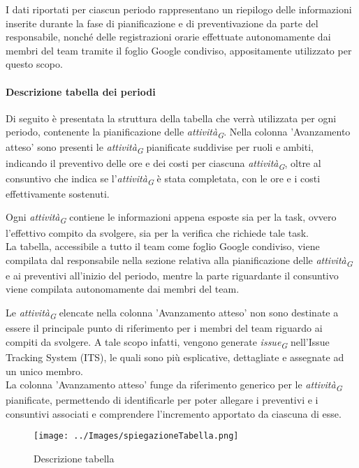 \vspace{0.2cm}

I dati riportati per ciascun periodo rappresentano un riepilogo delle informazioni inserite durante la fase di pianificazione e di preventivazione da parte del responsabile, nonché delle registrazioni orarie effettuate autonomamente dai membri del team tramite il foglio Google condiviso, appositamente utilizzato per questo scopo.

\paragraph{Descrizione tabella dei periodi}\label{sec:DescrTabella}

Di seguito è presentata la struttura della tabella che verrà utilizzata per ogni periodo, contenente la pianificazione delle \textit{attività}\textsubscript{\textit{G}}. Nella colonna 'Avanzamento atteso' sono presenti le \textit{attività}\textsubscript{\textit{G}} pianificate suddivise per ruoli e ambiti, indicando il preventivo delle ore e dei costi per ciascuna \textit{attività}\textsubscript{\textit{G}}, oltre al consuntivo che indica se l'\textit{attività}\textsubscript{\textit{G}} è stata completata, con le ore e i costi effettivamente sostenuti.

\vspace{0.2cm}

Ogni \textit{attività}\textsubscript{\textit{G}} contiene le informazioni appena esposte sia per la task, ovvero l'effettivo compito da svolgere,  sia per la verifica che richiede tale task. \\
La tabella, accessibile a tutto il team come foglio Google condiviso, viene compilata dal responsabile nella sezione relativa alla pianificazione delle \textit{attività}\textsubscript{\textit{G}} e ai preventivi all'inizio del periodo, mentre la parte riguardante il consuntivo viene compilata autonomamente dai membri del team.

\vspace{0.2cm}

Le \textit{attività}\textsubscript{\textit{G}} elencate nella colonna 'Avanzamento atteso' non sono destinate a essere il principale punto di riferimento per i membri del team riguardo ai compiti da svolgere. A tale scopo infatti, vengono generate \textit{issue}\textsubscript{\textit{G}} nell'Issue Tracking System (ITS), le quali sono più esplicative, dettagliate e assegnate ad un unico membro. \\
La colonna 'Avanzamento atteso' funge da riferimento generico per le \textit{attività}\textsubscript{\textit{G}} pianificate, permettendo di identificarle per poter allegare i preventivi e i consuntivi associati e comprendere l'incremento apportato da ciascuna di esse.

\vspace{0.5cm}

\begin{figure}[H]
    \centering
    \texttt{[image: ../Images/spiegazioneTabella.png]}
    \caption{Descrizione tabella} 
    \label{fig:spiegazioneTabella} 
\end{figure}